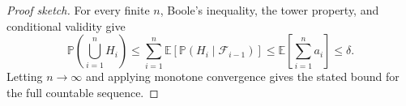 \documentclass[10pt,a4paper]{amsart}
\newcommand{\E}{\mathbb{E}}
\newcommand{\F}{\mathcal{F}}
\newcommand{\Prb}{\mathbb{P}}
\begin{document}
\begin{proof}[Proof sketch]
For every finite $n$, Boole's inequality, the tower property, and conditional validity give
\[
\Prb\!\left(\bigcup_{i=1}^{n}H_i\right)
\leq\sum_{i=1}^{n}\E[\Prb(H_i\mid\F_{i-1})]
\leq\E\!\left[\sum_{i=1}^{n}a_i\right]
\leq\delta.
\]
Letting $n\to\infty$ and applying monotone convergence gives the stated bound for the full
countable sequence.
\end{proof}
\end{document}
